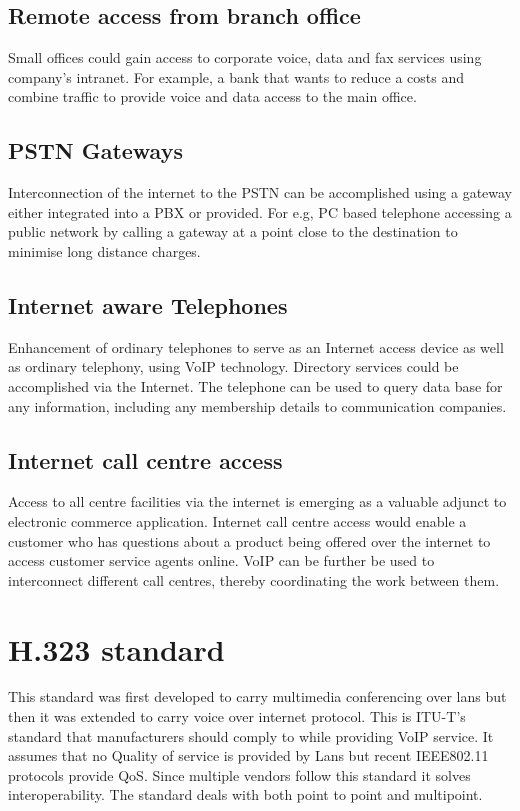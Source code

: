 \documentclass[12pt]{Book}
\begin{document}
    \subsection{Remote access from branch office}
    Small offices could gain access to corporate voice, data and fax services using 	 	
company’s intranet. For example, a bank that wants to reduce a costs and 	 	
combine traffic to provide voice and data access to the main office.
    \subsection{PSTN Gateways}
    Interconnection of the internet to the PSTN can be accomplished using a gateway either
integrated into a PBX or provided. For e.g, PC based telephone accessing a public 	 	
network by calling a gateway at a point close to the destination to minimise long distance
charges.
    \subsection{Internet aware Telephones}
    Enhancement of ordinary telephones to serve as an Internet access device as well
as ordinary telephony, using VoIP technology. Directory services could be 	 	
accomplished via the Internet. The telephone can be used to query data base for
any information, including any membership details to communication companies.
    \subsection{Internet call centre access}
    Access to all centre facilities via the internet is emerging as a valuable adjunct to
electronic commerce application. Internet call centre access would enable a 	 	
customer who has questions about a product being offered over the internet to 	 	
access customer service agents online. VoIP can be further be used to 	 	 	
interconnect different call centres, thereby coordinating the work between them.
    
    \section{H.323 standard}
    This standard was first developed to carry multimedia conferencing over lans but then it was extended to carry voice over internet protocol. This is ITU-T's standard that manufacturers should comply to while providing VoIP service. It assumes that no Quality of service is provided by Lans but recent IEEE802.11 protocols provide QoS. Since multiple vendors follow this standard it solves interoperability. The standard deals with both point to point and multipoint.
\end{document}
